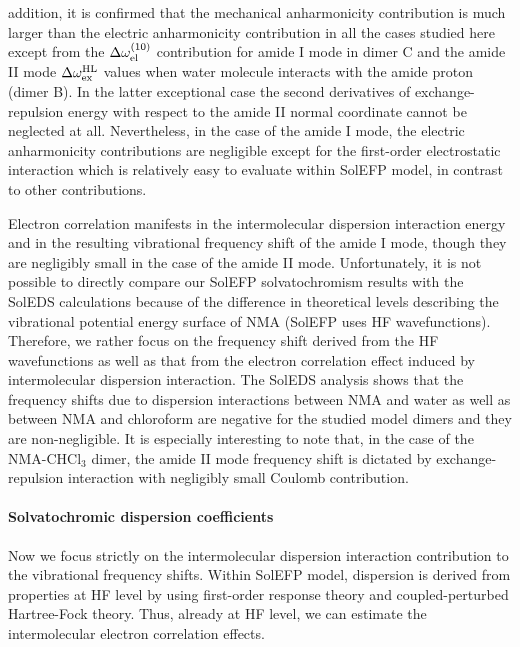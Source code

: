 \documentclass[b5paper,oneside,fleqn,11pt]{book}
\begin{document}
\begin{refsection}
addition, it is confirmed that
the mechanical anharmonicity
contribution is much larger than the electric
anharmonicity contribution in all the cases
studied here except from the $\Delta \omega_{{\rm el}}^{(10)}$ contribution for amide I mode 
in dimer C and the amide II mode
$\Delta \omega_{{\rm ex}}^{\rm HL}$ values when
water molecule interacts with the amide proton
(dimer B).
In the latter exceptional case the second derivatives of exchange\hyp{}
repulsion energy with respect to the amide II normal coordinate
cannot be neglected at all. 
Nevertheless, in the case of the amide I mode, the
electric anharmonicity contributions are negligible except for
the first\hyp{}order electrostatic interaction
which is relatively easy to evaluate within SolEFP model, in contrast to
other contributions.

Electron correlation manifests in the intermolecular
dispersion interaction energy and in the resulting vibrational
frequency shift of the amide I mode, though they are negligibly
small in the case of the amide II mode. Unfortunately, it is
not possible to directly compare our SolEFP solvatochromism
results with the SolEDS calculations because of the difference
in theoretical levels describing the vibrational potential energy
surface of NMA (SolEFP uses HF wavefunctions). Therefore,
we rather focus on the frequency shift derived from the HF
wavefunctions as well as that from the electron correlation
effect induced by intermolecular dispersion interaction. The
SolEDS analysis shows that the frequency shifts due to dispersion
interactions between NMA and water as well as between
NMA and chloroform are negative for the studied model
dimers and they are non\hyp{}negligible. It is especially interesting
to note that, in the case of the NMA\hyp{}CHCl$_3$ dimer, the amide
II mode frequency shift is dictated by exchange\hyp{}repulsion
interaction with negligibly small Coulomb contribution.

\paragraph{Solvatochromic dispersion coefficients\label{s:nma-sol-disp}}

Now we focus strictly on the intermolecular dispersion
interaction contribution to the vibrational frequency shifts.
Within SolEFP model, dispersion is derived from properties
at HF level by using first\hyp{}order response theory
and coupled\hyp{}perturbed Hartree\hyp{}Fock theory.
Thus, already at HF level, we can estimate the intermolecular
electron correlation effects.


\end{refsection}
\end{document}
